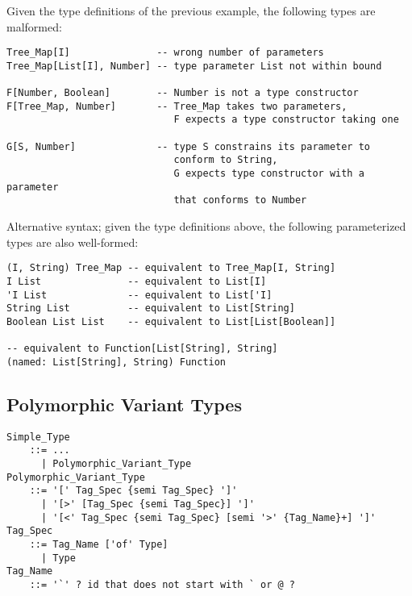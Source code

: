 \example
\label{example:parameterized-types-mal}

Given the type definitions of the previous example, the following types are malformed: 

\begin{lstlisting}
Tree_Map[I]               -- wrong number of parameters
Tree_Map[List[I], Number] -- type parameter List not within bound

F[Number, Boolean]        -- Number is not a type constructor
F[Tree_Map, Number]       -- Tree_Map takes two parameters, 
                             F expects a type constructor taking one

G[S, Number]              -- type S constrains its parameter to
                             conform to String, 
                             G expects type constructor with a parameter
                             that conforms to Number
\end{lstlisting}

\example Alternative syntax; given the type definitions above, the following parameterized types are also well-formed:

\begin{lstlisting}
(I, String) Tree_Map -- equivalent to Tree_Map[I, String]
I List               -- equivalent to List[I]
'I List              -- equivalent to List['I]
String List          -- equivalent to List[String]
Boolean List List    -- equivalent to List[List[Boolean]]

-- equivalent to Function[List[String], String]
(named: List[String], String) Function
\end{lstlisting}





\subsection{Polymorphic Variant Types}
\label{sec:polymorphic-variant-types}

\grammar\begin{lstlisting}[deletekeywords={not,with,or}]
Simple_Type 
    ::= ...
      | Polymorphic_Variant_Type
Polymorphic_Variant_Type 
    ::= '[' Tag_Spec {semi Tag_Spec} ']'
      | '[>' [Tag_Spec {semi Tag_Spec}] ']'
      | '[<' Tag_Spec {semi Tag_Spec} [semi '>' {Tag_Name}+] ']'
Tag_Spec 
    ::= Tag_Name ['of' Type]
      | Type
Tag_Name 
    ::= '`' ? id that does not start with ` or @ ?
\end{lstlisting}

